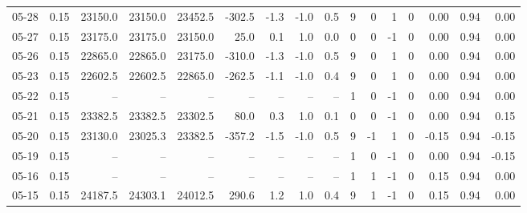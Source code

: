\begin{threeparttable}
{\begin{tabular}{lrrrrrrrrrrrrrrr}
  05-28 &     0.15 & 23150.0 & 23150.0 & 23452.5 &     -302.5 &           -1.3 &                     -1.0 &                 0.5 &              9 &         0 &     1 &         0 &       0.00 &      0.94 &           0.00 \\
  05-27 &     0.15 & 23175.0 & 23175.0 & 23150.0 &       25.0 &            0.1 &                      1.0 &                 0.0 &              0 &         0 &    -1 &         0 &       0.00 &      0.94 &           0.00 \\
  05-26 &     0.15 & 22865.0 & 22865.0 & 23175.0 &     -310.0 &           -1.3 &                     -1.0 &                 0.5 &              9 &         0 &     1 &         0 &       0.00 &      0.94 &           0.00 \\
  05-23 &     0.15 & 22602.5 & 22602.5 & 22865.0 &     -262.5 &           -1.1 &                     -1.0 &                 0.4 &              9 &         0 &     1 &         0 &       0.00 &      0.94 &           0.00 \\
  05-22 &     0.15 &      -- &      -- &      -- &         -- &             -- &                       -- &                  -- &              1 &         0 &    -1 &         0 &       0.00 &      0.94 &           0.00 \\
  05-21 &     0.15 & 23382.5 & 23382.5 & 23302.5 &       80.0 &            0.3 &                      1.0 &                 0.1 &              0 &         0 &    -1 &         0 &       0.00 &      0.94 &           0.15 \\
  05-20 &     0.15 & 23130.0 & 23025.3 & 23382.5 &     -357.2 &           -1.5 &                     -1.0 &                 0.5 &              9 &        -1 &     1 &         0 &      -0.15 &      0.94 &          -0.15 \\
  05-19 &     0.15 &      -- &      -- &      -- &         -- &             -- &                       -- &                  -- &              1 &         0 &    -1 &         0 &       0.00 &      0.94 &          -0.15 \\
  05-16 &     0.15 &      -- &      -- &      -- &         -- &             -- &                       -- &                  -- &              1 &         1 &    -1 &         0 &       0.15 &      0.94 &           0.00 \\
  05-15 &     0.15 & 24187.5 & 24303.1 & 24012.5 &      290.6 &            1.2 &                      1.0 &                 0.4 &              9 &         1 &    -1 &         0 &       0.15 &      0.94 &           0.00 \\

\end{tabular}}
\end{threeparttable}
